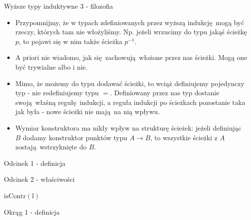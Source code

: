 \documentclass{beamer}
\newcommand{\isContr}{\text{isContr}}
\newcommand{\I}{\mathbb{I}}
\begin{document}
\begin{frame}{Wyższe typy induktywne 3 - filozofia}
\begin{itemize}
	\item Przypomnijmy, że w typach zdefiniowanych przez wyższą indukcję mogą być rzeczy, których tam nie włożyliśmy. Np. jeżeli wrzucimy do typu jakąś ścieżkę $p$, to pojawi się w nim także ścieżka $p^{-1}$.
	\item A priori nie wiadomo, jak się zachowują włożone przez nas ścieżki. Mogą one być trywialne albo i nie.
	\item Mimo, że możemy do typu dodawać ścieżki, to wciąż definiujemy pojedynczy typ - nie redefiniujemy typu $=$. Definiowany przez nas typ dostanie swoją właśną regułę indukcji, a reguła indukcji po ścieżkach pozostanie taka jak była - nowe ścieżki nie mają na nią wpływu.
	\item Wymiar konstruktora ma nikły wpływ na strukturę ścieżek: jeżeli definiując $B$ dodamy konstruktor punktów typu $A \to B$, to wszystkie ścieżki z $A$ zostają wstrzyknięte do $B$.
\end{itemize}
\end{frame}

\begin{frame}{Odcinek 1 - definicja}


\end{frame}

\begin{frame}{Odcinek 2 - właściwości}
	
\begin{theorem}
$\isContr(\I)$
\end{theorem}

\end{frame}



\begin{frame}{Okrąg 1 - definicja}


\end{frame}
\end{document}

